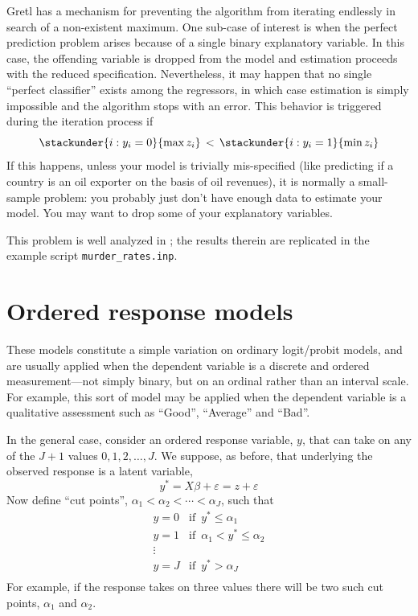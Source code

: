 Gretl has a mechanism for preventing the algorithm from
iterating endlessly in search of a non-existent maximum. One sub-case
of interest is when the perfect prediction problem arises because of
a single binary explanatory variable. In this case, the offending
variable is dropped from the model and estimation proceeds with the
reduced specification. Nevertheless, it may happen that no single
``perfect classifier'' exists among the regressors, in which case
estimation is simply impossible and the algorithm stops with an
error. This behavior is triggered during the iteration process if
\[
  \stackunder{i: y_i = 0}{\max z_i} \, < \,
  \stackunder{i: y_i = 1}{\min z_i}  
\]
If this happens, unless your model is trivially mis-specified (like
predicting if a country is an oil exporter on the basis of oil
revenues), it is normally a small-sample problem: you probably just
don't have enough data to estimate your model. You may want to drop
some of your explanatory variables.

This problem is well analyzed in \cite{stokes04}; the results therein
are replicated in the example script \texttt{murder\_rates.inp}. 

\section{Ordered response models}
\label{sec:ordered}

These models constitute a simple variation on ordinary logit/probit
models, and are usually applied when the dependent variable is a
discrete and ordered measurement---not simply binary, but on an
ordinal rather than an interval scale.  For example, this sort of
model may be applied when the dependent variable is a qualitative
assessment such as ``Good'', ``Average'' and ``Bad''.  

In the general case, consider an ordered response variable, $y$, that
can take on any of the $J+1$ values ${0,1,2,\dots,J}$.  We suppose, as
before, that underlying the observed response is a latent variable,
\[
  y^* = X\beta + \varepsilon = z + \varepsilon
\]
Now define ``cut points'', $\alpha_1 < \alpha_2 < \cdots < \alpha_J$,
such that
%
\begin{equation*}
  \begin{array}{ll}
    y = 0 & \textrm{if } \, y^* \leq \alpha_1 \\
    y = 1 & \textrm{if } \, \alpha_1 < y^* \leq \alpha_2 \\
    \vdots \\
    y = J & \textrm{if } \, y^* > \alpha_J \\
  \end{array}
\end{equation*}
For example, if the response takes on three values there will be two
such cut points, $\alpha_1$ and $\alpha_2$. 

